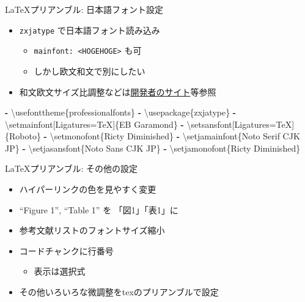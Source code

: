 \documentclass[
  12pt,
  ignorenonframetext,
]{beamer}
\newenvironment{Shaded}{\begin{snugshade}}{\end{snugshade}}
\newcommand{\AttributeTok}[1]{\textcolor[rgb]{0.77,0.63,0.00}{#1}}
\newcommand{\KeywordTok}[1]{\textcolor[rgb]{0.13,0.29,0.53}{\textbf{#1}}}
\providecommand{\tightlist}{%
  \setlength{\itemsep}{0pt}\setlength{\parskip}{0pt}}
\begin{document}
\begin{frame}[fragile]{\LaTeX プリアンブル: 日本語フォント設定}
\protect\hypertarget{ux30d7ux30eaux30a2ux30f3ux30d6ux30eb-ux65e5ux672cux8a9eux30d5ux30a9ux30f3ux30c8ux8a2dux5b9a}{}

\begin{itemize}
\tightlist
\item
  \texttt{zxjatype} で日本語フォント読み込み

  \begin{itemize}
  \tightlist
  \item
    \texttt{mainfont:\ \textless{}HOGEHOGE\textgreater{}} も可
  \item
    しかし欧文和文で別にしたい
  \end{itemize}
\item
  和文欧文サイズ比調整などは\href{http://zrbabbler.sp.land.to/zxjatype.html}{開発者のサイト}等参照
\end{itemize}

\begin{Shaded}
\begin{Highlighting}[]
\KeywordTok{-}\AttributeTok{ \textbackslash{}usefonttheme\{professionalfonts\}}
\KeywordTok{-}\AttributeTok{ \textbackslash{}usepackage\{zxjatype\}}
\KeywordTok{-}\AttributeTok{ \textbackslash{}setmainfont[Ligatures=TeX]\{EB Garamond\}}
\KeywordTok{-}\AttributeTok{ \textbackslash{}setsansfont[Ligatures=TeX]\{Roboto\}}
\KeywordTok{-}\AttributeTok{ \textbackslash{}setmonofont\{Ricty Diminished\}}
\KeywordTok{-}\AttributeTok{ \textbackslash{}setjamainfont\{Noto Serif CJK JP\}}
\KeywordTok{-}\AttributeTok{ \textbackslash{}setjasansfont\{Noto Sans CJK JP\}}
\KeywordTok{-}\AttributeTok{ \textbackslash{}setjamonofont\{Ricty Diminished\}}
\end{Highlighting}
\end{Shaded}

\end{frame}

\begin{frame}{\LaTeX プリアンブル: その他の設定}
\protect\hypertarget{ux30d7ux30eaux30a2ux30f3ux30d6ux30eb-ux305dux306eux4ed6ux306eux8a2dux5b9a}{}

\begin{itemize}
\tightlist
\item
  ハイパーリンクの色を見やすく変更
\item
  ``Figure 1'', ``Table 1'' を 「図1」「表1」に
\item
  参考文献リストのフォントサイズ縮小
\item
  コードチャンクに行番号

  \begin{itemize}
  \tightlist
  \item
    表示は選択式
  \end{itemize}
\item
  その他いろいろな微調整をtexのプリアンブルで設定
\end{itemize}

\end{frame}
\end{document}
